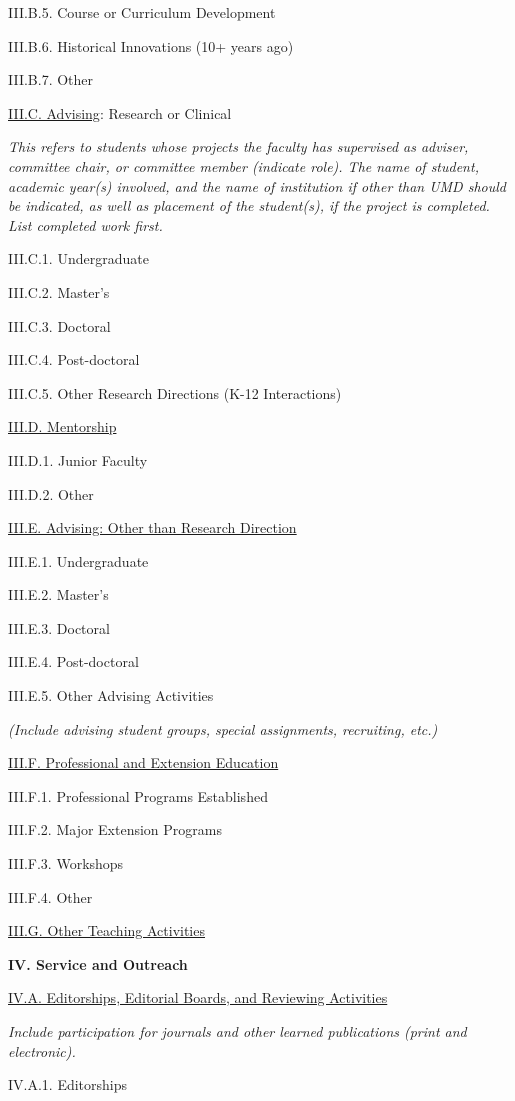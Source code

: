 \documentclass[11pt,letterpaper]{article}
\begin{document}
III.B.5. Course or Curriculum Development

III.B.6. Historical Innovations (10+ years ago)

III.B.7. Other


\underline{III.C. Advising}: Research or Clinical

\textit{This refers to students whose projects the faculty has supervised as adviser, committee chair, or committee member (indicate role). The name of student, academic year(s) involved, and the name of institution if other than UMD should be indicated, as well as placement of the student(s), if the project is completed.  List completed work first.}

III.C.1. Undergraduate

III.C.2. Master's

III.C.3. Doctoral

III.C.4. Post-doctoral

III.C.5. Other Research Directions (K-12 Interactions)


\underline{III.D. Mentorship}

III.D.1. Junior Faculty

III.D.2. Other


\underline{III.E. Advising: Other than Research Direction}

III.E.1. Undergraduate

III.E.2. Master's

III.E.3. Doctoral

III.E.4. Post-doctoral

III.E.5. Other Advising Activities

\textit{(Include advising student groups, special assignments, recruiting, etc.)}


\underline{III.F. Professional and Extension Education}

III.F.1. Professional Programs Established

III.F.2. Major Extension Programs

III.F.3. Workshops

III.F.4. Other


\underline{III.G. Other Teaching Activities}


\textbf{IV. Service and Outreach}


\underline{IV.A. Editorships, Editorial Boards, and Reviewing Activities}

\textit{Include participation for journals and other learned publications (print and electronic).}

IV.A.1. Editorships
\end{document}
